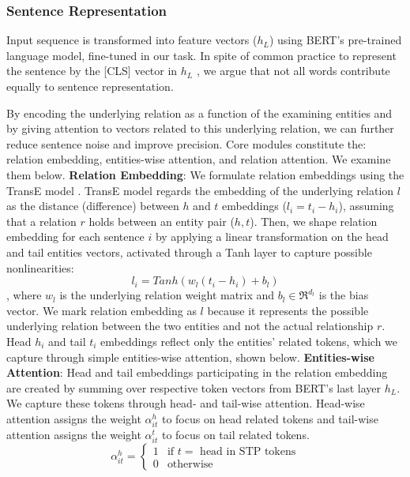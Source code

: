 \documentclass[11pt,a4paper]{article}
\begin{document}
\subsubsection{Sentence Representation}
Input sequence is transformed into feature vectors ($h_L$) using BERT's pre-trained language model, fine-tuned in our task. In spite of common practice to represent the sentence by the [CLS] vector in $h_L$ \cite{Alt2019}, we argue that not all words contribute equally to sentence representation. 

By encoding the underlying relation as a function of the examining entities and by giving attention to vectors related to this underlying relation, we can further reduce sentence noise and improve precision. Core modules constitute the: relation embedding, entities-wise attention, and relation attention. We examine them below.
\smallskip
\newline
\textbf{Relation Embedding}:
We formulate relation embeddings using the TransE model \cite{Bordes2013}. TransE model regards the embedding of the underlying relation $l$ as the distance (difference) between $h$ and $t$ embeddings ($l_i=t_i-h_i$), assuming that a relation $r$ holds between an entity pair ($h, t$). Then, we shape relation embedding for each sentence $i$ by applying a linear transformation on the head and tail entities vectors, activated through a Tanh layer to capture possible nonlinearities:
\begin{equation}
  l_{i} = Tanh(w_l(t_i - h_i) + b_l)
\end{equation}
, where $w_l$ is the underlying relation weight matrix and $b_l \in \Re^{d_t}$ is the bias vector.
We mark relation embedding as $l$ because it represents the possible underlying relation between the two entities and not the actual relationship $r$. Head $h_i$ and tail $t_i$ embeddings reflect only the entities' related tokens, which we capture through simple entities-wise attention, shown below.
\newline
\textbf{Entities-wise Attention}:
Head and tail embeddings participating in the relation embedding are created by summing over respective token vectors from BERT's last layer $h_L$. We capture these tokens through head- and tail-wise attention. Head-wise attention assigns the weight $\alpha_{it}^{h}$ to focus on head related tokens and tail-wise attention assigns the weight $\alpha_{it}^{t}$ to focus on tail related tokens. 
\begin{equation}
  \alpha_{it}^{h} =
    \begin{cases}
      1& \text{if $t= $ head in STP tokens} \\
      0&  \text{otherwise}
    \end{cases}       
\end{equation}
\end{document}
